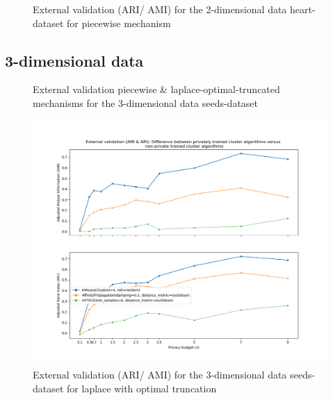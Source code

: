 \begin{figure}[!htbp]
\begin{minipage}[c]{0.49\textwidth}
        \caption{External validation (ARI/ AMI) for the 2-dimensional data heart-dataset for piecewise mechanism}
        \label{fig:external-validation-heart-dataset_comparison_2d-piecewise}
    \end{minipage}
\end{figure}
\subsection{3-dimensional data}
\begin{figure}[H]
    \caption{External validation piecewise \& laplace-optimal-truncated mechanisms for the 3-dimensional data seeds-dataset}
    \centering
    \begin{minipage}[c]{0.49\textwidth}
        \includegraphics[width=1\textwidth]{Results/3d-laplace-optimal-truncated/seeds-dataset/ami-and-ari.png}
        \caption{External validation (ARI/ AMI) for the 3-dimensional data seeds-dataset for laplace with optimal truncation}
        \label{fig:external-validation-seeds-dataset_comparison_3d-laplace}
    \end{minipage}
    \begin{minipage}[c]{0.49\textwidth}

\end{minipage}
\end{figure}
